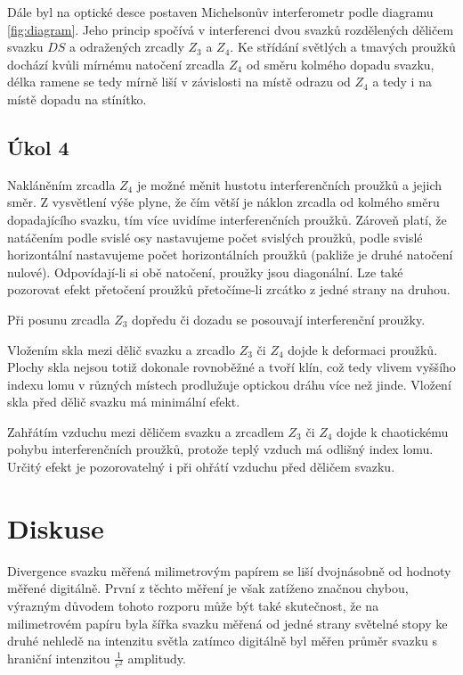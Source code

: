 \documentclass{protokol}
\begin{document}
      Dále byl na optické desce postaven Michelsonův interferometr podle diagramu \ref{fig:diagram}. Jeho princip spočívá v interferenci dvou svazků rozdělených děličem svazku $DS$ a odražených zrcadly $Z_3$ a $Z_4$. Ke střídání světlých a tmavých proužků dochází kvůli mírnému natočení zrcadla $Z_4$ od směru kolmého dopadu svazku, délka ramene se tedy mírně liší v závislosti na místě odrazu od $Z_4$ a tedy i na místě dopadu na stínítko.

    \subsection*{Úkol 4}

      Nakláněním zrcadla $Z_4$ je možné měnit hustotu interferenčních proužků a jejich směr. Z vysvětlení výše plyne, že čím větší je náklon zrcadla od kolmého směru dopadajícího svazku, tím více uvidíme interferenčních proužků. Zároveň platí, že natáčením podle svislé osy nastavujeme počet svislých proužků, podle svislé horizontální nastavujeme počet horizontálních proužků (pakliže je druhé natočení nulové). Odpovídají-li si obě natočení, proužky jsou diagonální. Lze také pozorovat efekt přetočení proužků přetočíme-li zrcátko z jedné strany na druhou.

      Při posunu zrcadla $Z_3$ dopředu či dozadu se posouvají interferenční proužky.

      Vložením skla mezi dělič svazku a zrcadlo $Z_3$ či $Z_4$ dojde k deformaci proužků. Plochy skla nejsou totiž dokonale rovnoběžné a tvoří klín, což tedy vlivem vyššího indexu lomu v různých místech prodlužuje optickou dráhu více než jinde. Vložení skla před dělič svazku má minimální efekt.

      Zahřátím vzduchu mezi děličem svazku a zrcadlem $Z_3$ či $Z_4$ dojde k chaotickému pohybu interferenčních proužků, protože teplý vzduch má odlišný index lomu. Určitý efekt je pozorovatelný i při ohřátí vzduchu před děličem svazku.

  \section*{Diskuse}

    Divergence svazku měřená milimetrovým papírem se liší dvojnásobně od hodnoty měřené digitálně. První z těchto měření je však zatíženo značnou chybou, výrazným důvodem tohoto rozporu může být také skutečnost, že na milimetrovém papíru byla šířka svazku měřená od jedné strany světelné stopy ke druhé nehledě na intenzitu světla zatímco digitálně byl měřen průměr svazku s hraniční intenzitou $\frac{1}{e^2}$ amplitudy.
\end{document}
